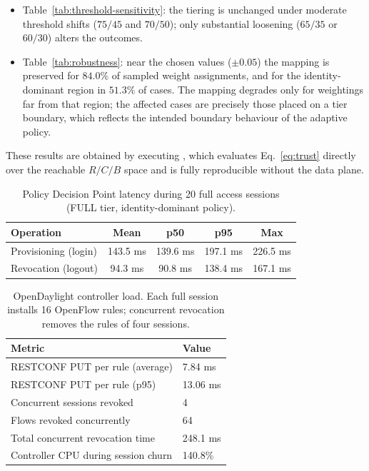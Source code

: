 \begin{itemize}
  \item Table~\ref{tab:threshold-sensitivity}: the tiering is unchanged under
        moderate threshold shifts ($75/45$ and $70/50$); only substantial
        loosening ($65/35$ or $60/30$) alters the outcomes.
  \item Table~\ref{tab:robustness}: near the chosen values ($\pm 0.05$) the
        mapping is preserved for $84.0\%$ of sampled weight assignments, and
        for the identity-dominant region in $51.3\%$ of cases. The mapping
        degrades only for weightings far from that region; the affected cases
        are precisely those placed on a tier boundary, which reflects the
        intended boundary behaviour of the adaptive policy.
\end{itemize}

These results are obtained by executing
, which evaluates Eq.~\eqref{eq:trust} directly
over the reachable $R/C/B$ space and is fully reproducible without the data
plane.


\begin{table}[t]
  \caption{Policy Decision Point latency during 20 full access sessions
  (FULL tier, identity-dominant policy).}
  \label{tab:latency}
  \centering
  \begin{tabular}{lcccc}
    \hline
    \textbf{Operation} & \textbf{Mean} & \textbf{p50} & \textbf{p95} & \textbf{Max} \\
    \hline
    Provisioning (login)  & 143.5 ms & 139.6 ms & 197.1 ms & 226.5 ms \\
    Revocation (logout)   &  94.3 ms &  90.8 ms & 138.4 ms & 167.1 ms \\
    \hline
  \end{tabular}
\end{table}

\begin{table}[t]
  \caption{OpenDaylight controller load. Each full session installs 16
  OpenFlow rules; concurrent revocation removes the rules of four sessions.}
  \label{tab:controller-load}
  \centering
  \begin{tabular}{ll}
    \hline
    \textbf{Metric} & \textbf{Value} \\
    \hline
    RESTCONF PUT per rule (average)        & 7.84 ms \\
    RESTCONF PUT per rule (p95)            & 13.06 ms \\
    Concurrent sessions revoked            & 4 \\
    Flows revoked concurrently             & 64 \\
    Total concurrent revocation time       & 248.1 ms \\
    Controller CPU during session churn    & 140.8\% \\
    \hline
  \end{tabular}
\end{table}

